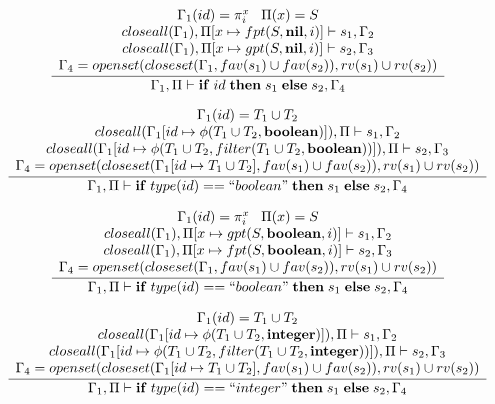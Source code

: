 \[
\dfrac{\begin{array}{c}
       \Gamma_{1}(id) = \pi_{i}^{x} \;\;\; \Pi(x) = S\\
       closeall(\Gamma_{1}), \Pi[x \mapsto fpt(S,\mathbf{nil},i)] \vdash s_{1}, \Gamma_{2} \\
       closeall(\Gamma_{1}), \Pi[x \mapsto gpt(S,\mathbf{nil},i)] \vdash s_{2}, \Gamma_{3} \\
       \Gamma_{4} = openset(closeset(\Gamma_{1}, fav(s_{1}) \cup fav(s_{2})),rv(s_{1}) \cup rv(s_{2}))
      \end{array}}
      {\Gamma_{1}, \Pi \vdash \mathbf{if} \; id \; \mathbf{then} \; s_{1} \; \mathbf{else} \; s_{2}, \Gamma_{4}}
\]

\[
\dfrac{\begin{array}{c}
       \Gamma_{1}(id) = T_{1} \cup T_{2}\\
       closeall(\Gamma_{1}[id \mapsto \phi(T_{1} \cup T_{2},\mathbf{boolean})]), \Pi \vdash s_{1}, \Gamma_{2} \\
       closeall(\Gamma_{1}[id \mapsto \phi(T_{1} \cup T_{2},filter(T_{1} \cup T_{2}, \mathbf{boolean}))]), \Pi \vdash s_{2}, \Gamma_{3}\\
       \Gamma_{4} = openset(closeset(\Gamma_{1}[id \mapsto T_{1} \cup T_{2}], fav(s_{1}) \cup fav(s_{2})),rv(s_{1}) \cup rv(s_{2}))
      \end{array}}
      {\Gamma_{1}, \Pi \vdash \mathbf{if} \; type(id) == ``boolean" \; \mathbf{then} \; s_{1} \; \mathbf{else} \; s_{2}, \Gamma_{4}}
\]

\[
\dfrac{\begin{array}{c}
       \Gamma_{1}(id) = \pi_{i}^{x} \;\;\; \Pi(x) = S\\
       closeall(\Gamma_{1}), \Pi[x \mapsto gpt(S,\mathbf{boolean},i)] \vdash s_{1}, \Gamma_{2} \\
       closeall(\Gamma_{1}), \Pi[x \mapsto fpt(S,\mathbf{boolean},i)] \vdash s_{2}, \Gamma_{3} \\
       \Gamma_{4} = openset(closeset(\Gamma_{1}, fav(s_{1}) \cup fav(s_{2})),rv(s_{1}) \cup rv(s_{2}))
      \end{array}}
      {\Gamma_{1}, \Pi \vdash \mathbf{if} \; type(id) == ``boolean" \; \mathbf{then} \; s_{1} \; \mathbf{else} \; s_{2}, \Gamma_{4}}
\]

\[
\dfrac{\begin{array}{c}
       \Gamma_{1}(id) = T_{1} \cup T_{2}\\
       closeall(\Gamma_{1}[id \mapsto \phi(T_{1} \cup T_{2},\mathbf{integer})]), \Pi \vdash s_{1}, \Gamma_{2} \\
       closeall(\Gamma_{1}[id \mapsto \phi(T_{1} \cup T_{2},filter(T_{1} \cup T_{2}, \mathbf{integer}))]), \Pi \vdash s_{2}, \Gamma_{3}\\
       \Gamma_{4} = openset(closeset(\Gamma_{1}[id \mapsto T_{1} \cup T_{2}], fav(s_{1}) \cup fav(s_{2})),rv(s_{1}) \cup rv(s_{2}))
      \end{array}}
      {\Gamma_{1}, \Pi \vdash \mathbf{if} \; type(id) == ``integer" \; \mathbf{then} \; s_{1} \; \mathbf{else} \; s_{2}, \Gamma_{4}}
\]

